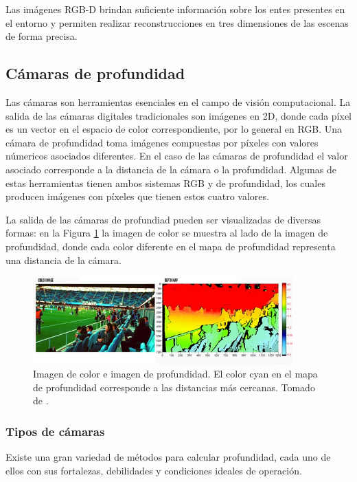 Las imágenes RGB-D brindan suficiente información sobre los entes presentes en el entorno y permiten realizar reconstrucciones en tres dimensiones de las escenas de forma precisa. 

\subsection{Cámaras de profundidad}

Las cámaras son herramientas esenciales en el campo de visión computacional. La salida de las cámaras digitales tradicionales son imágenes en 2D, donde cada píxel es un vector en el espacio de color correspondiente, por lo general en RGB. Una cámara de profundidad toma imágenes compuestas por píxeles con valores númericos asociados diferentes. En el caso de las cámaras de profundidad el valor asociado corresponde a la distancia de la cámara o la profundidad. Algunas de estas herramientas tienen ambos sistemas RGB y de profundidad, los cuales producen imágenes con píxeles que tienen estos cuatro valores.

La salida de las cámaras de profundiad pueden ser visualizadas de diversas formas: en la Figura \ref{fig:rgbd} la imagen de color se muestra al lado de la imagen de profundidad, donde cada color diferente en el mapa de profundidad representa una distancia de la cámara.

\begin{figure}[h]
	\centering
	\includegraphics[width=10cm]{./Graphics/rgbd.png}
	\caption{Imagen de color e imagen de profundidad. El color cyan en el mapa de profundidad corresponde a las distancias más cercanas. Tomado de \cite{intel}.}
	\label{fig:rgbd}
\end{figure}

\subsubsection{Tipos de cámaras}

Existe una gran variedad de métodos para calcular profundidad, cada uno de ellos con sus fortalezas, debilidades y condiciones ideales de operación. 


